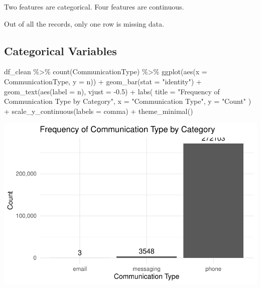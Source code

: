 \documentclass[
  letterpaper,
  DIV=11,
  numbers=noendperiod]{scrartcl}
\newenvironment{Shaded}{\begin{snugshade}}{\end{snugshade}}
\newcommand{\AttributeTok}[1]{\textcolor[rgb]{0.40,0.45,0.13}{#1}}
\newcommand{\FloatTok}[1]{\textcolor[rgb]{0.68,0.00,0.00}{#1}}
\newcommand{\FunctionTok}[1]{\textcolor[rgb]{0.28,0.35,0.67}{#1}}
\newcommand{\NormalTok}[1]{\textcolor[rgb]{0.00,0.23,0.31}{#1}}
\newcommand{\SpecialCharTok}[1]{\textcolor[rgb]{0.37,0.37,0.37}{#1}}
\newcommand{\StringTok}[1]{\textcolor[rgb]{0.13,0.47,0.30}{#1}}
\begin{document}
Two features are categorical. Four features are continuous.

Out of all the records, only one row is missing data.

\subsection{Categorical Variables}\label{categorical-variables}

\begin{Shaded}
\begin{Highlighting}[]
\NormalTok{df\_clean }\SpecialCharTok{\%\textgreater{}\%}
  \FunctionTok{count}\NormalTok{(CommunicationType) }\SpecialCharTok{\%\textgreater{}\%}
  \FunctionTok{ggplot}\NormalTok{(}\FunctionTok{aes}\NormalTok{(}\AttributeTok{x =}\NormalTok{ CommunicationType, }\AttributeTok{y =}\NormalTok{ n)) }\SpecialCharTok{+}
  \FunctionTok{geom\_bar}\NormalTok{(}\AttributeTok{stat =} \StringTok{"identity"}\NormalTok{) }\SpecialCharTok{+} 
  \FunctionTok{geom\_text}\NormalTok{(}\FunctionTok{aes}\NormalTok{(}\AttributeTok{label =}\NormalTok{ n), }\AttributeTok{vjust =} \SpecialCharTok{{-}}\FloatTok{0.5}\NormalTok{) }\SpecialCharTok{+}
  \FunctionTok{labs}\NormalTok{(}
    \AttributeTok{title =} \StringTok{"Frequency of Communication Type by Category"}\NormalTok{,}
    \AttributeTok{x =} \StringTok{"Communication Type"}\NormalTok{, }
    \AttributeTok{y =} \StringTok{"Count"}
\NormalTok{  ) }\SpecialCharTok{+}
  \FunctionTok{scale\_y\_continuous}\NormalTok{(}\AttributeTok{labels =}\NormalTok{ comma) }\SpecialCharTok{+}
  \FunctionTok{theme\_minimal}\NormalTok{()}
\end{Highlighting}
\end{Shaded}

\includegraphics{final_proj_group1_files/figure-pdf/com_type-1.pdf}
\end{document}
